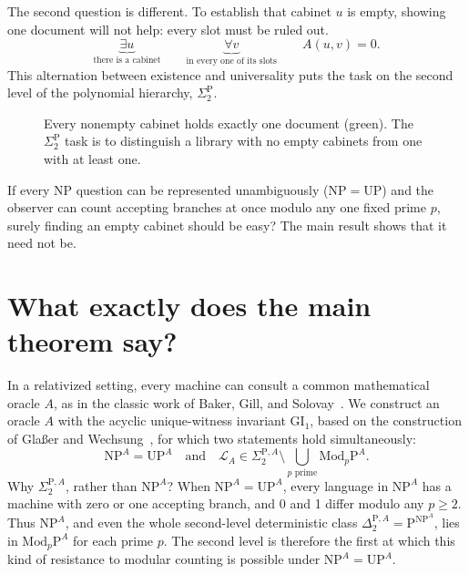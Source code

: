 \documentclass[11pt,a4paper]{article}
\newcommand{\NP}{\mathrm{NP}}
\newcommand{\UP}{\mathrm{UP}}
\newcommand{\MP}[1]{\mathrm{Mod}_{#1}\mathrm P}
\newcommand{\LA}{\mathcal L_A}
\newcommand{\GI}{\mathrm{GI}_1}
\newcommand{\Sig}{\Sigma_2^{\mathrm P,A}}
\begin{document}
The second question is different. To establish that cabinet \(u\) is empty, showing one document will not help: every slot must be ruled out.
\[
 \underbrace{\exists u}_{\text{there is a cabinet}}\qquad
 \underbrace{\forall v}_{\text{in every one of its slots}}\qquad A(u,v)=0.
\]
This alternation between existence and universality puts the task on the second level of the polynomial hierarchy, \(\Sigma_2^{\mathrm P}\).

\begin{figure}[htbp]\centering
{}
\caption{Every nonempty cabinet holds exactly one document (green). The \(\Sigma_2^{\mathrm P}\) task is to distinguish a library with no empty cabinets from one with at least one.}
\end{figure}

If every \(\NP\) question can be represented unambiguously (\(\NP=\UP\)) and the observer can count accepting branches at once modulo any one fixed prime \(p\), surely finding an empty cabinet should be easy? The main result shows that it need not be.

\section{What exactly does the main theorem say?}
In a relativized setting, every machine can consult a common mathematical oracle \(A\), as in the classic work of Baker, Gill, and Solovay~\cite{bgs}. We construct an oracle \(A\) with the acyclic unique-witness invariant \(\GI\), based on the construction of Glaßer and Wechsung~\cite{gw}, for which two statements hold simultaneously:
\[
 \NP^A=\UP^A\quad\text{and}\quad
 \LA\in\Sig\setminus\bigcup_{p\text{ prime}}\MP p^A .
\]
Why \(\Sig\), rather than \(\NP^A\)? When \(\NP^A=\UP^A\), every language in \(\NP^A\) has a machine with zero or one accepting branch, and 0 and 1 differ modulo any \(p\ge 2\). Thus \(\NP^A\), and even the whole second-level deterministic class \(\Delta_2^{\mathrm P,A}=\mathrm P^{\NP^A}\), lies in \(\MP p^A\) for each prime \(p\). The second level is therefore the first at which this kind of resistance to modular counting is possible under \(\NP^A=\UP^A\).
\end{document}
